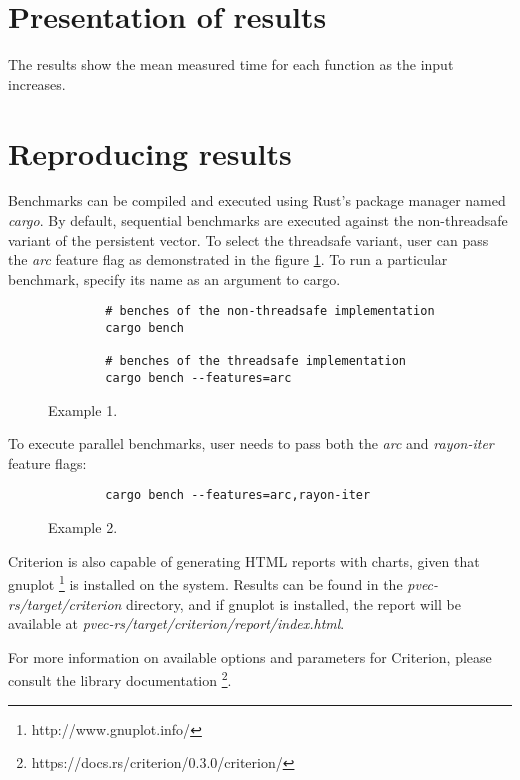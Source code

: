 \section{Presentation of results}
The results show the mean measured time for each function as the input increases. 

\section{Reproducing results}
Benchmarks can be compiled and executed using Rust's package manager named \emph{cargo}. By default, sequential benchmarks are executed against the non-threadsafe variant of the persistent vector. To select the threadsafe variant, user can pass the \emph{arc} feature flag as demonstrated in the figure \ref{fig:sequential-benches}. To run a particular benchmark, specify its name as an argument to cargo. 

\begin{figure}[!htbp]
    \centering

    \begin{verbatim}
        # benches of the non-threadsafe implementation
        cargo bench

        # benches of the threadsafe implementation
        cargo bench --features=arc 
    \end{verbatim}
    
    \caption{Example 1.}
    \label{fig:sequential-benches}
\end{figure}

To execute parallel benchmarks, user needs to pass both the \emph{arc} and \emph{rayon-iter} feature flags: 

\begin{figure}[!htbp]
    \centering

    \begin{verbatim}
        cargo bench --features=arc,rayon-iter
    \end{verbatim}
    
    \caption{Example 2.}
    \label{fig:parallel-benches}
\end{figure}

Criterion is also capable of generating HTML reports with charts, given that gnuplot \footnote{http://www.gnuplot.info/} is installed on the system. Results can be found in the \emph{pvec-rs/target/criterion} directory, and if gnuplot is installed, the report will be available at \emph{pvec-rs/target/criterion/report/index.html}. 

For more information on available options and parameters for Criterion, please consult the library documentation \footnote{https://docs.rs/criterion/0.3.0/criterion/}.
